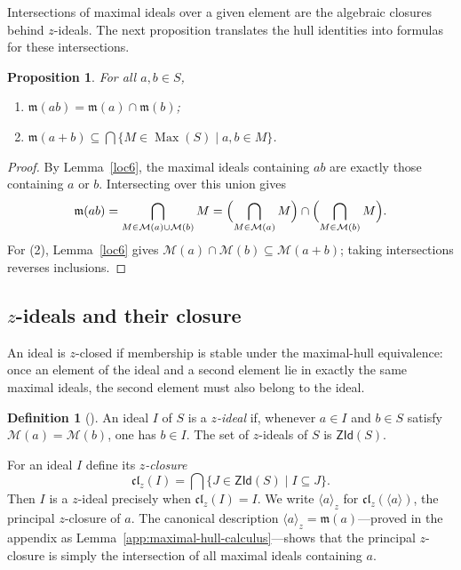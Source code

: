 \documentclass[11pt,leqno]{amsart}
\theoremstyle{plain}
\newtheorem{proposition}[theorem]{Proposition}
\theoremstyle{definition}
\newtheorem{definition}{Definition}[section]
\theoremstyle{remark}
\numberwithin{equation}{section}
\DeclareMathOperator{\Max}{Max}
\newcommand{\ZId}{\mathsf{ZId}}
\newcommand{\M}{\mathcal M}
\newcommand{\mfrak}{\mathfrak m}
\newcommand{\clz}{\mathfrak{cl}_{z}}
\newcommand{\ideal}[1]{\langle #1\rangle}
\begin{document}
Intersections of maximal ideals over a given element are the
algebraic closures behind $z$-ideals.
The next proposition translates the hull identities
into formulas for these intersections.

\begin{proposition}\label{prop:mfrak-basic}
For all $a,b\in S$,
\begin{enumerate}
\item $\mfrak(ab)=\mfrak(a)\cap\mfrak(b)$;
\item $\mfrak(a+b)\subseteq\displaystyle
  \bigcap\{M\in\Max(S)\mid a,b\in M\}$.
\end{enumerate}
\end{proposition}
\begin{proof}
By Lemma~\ref{loc6}, the maximal ideals containing $ab$ are exactly
those containing $a$ or $b$.  Intersecting over this union gives
\[
\mfrak(ab)=\bigcap_{M\in\M(a)\cup\M(b)}M
=\Bigl(\bigcap_{M\in\M(a)}M\Bigr)\cap\Bigl(\bigcap_{M\in\M(b)}M\Bigr).
\]
For (2), Lemma~\ref{loc6} gives $\M(a)\cap\M(b)\subseteq\M(a+b)$;
taking intersections reverses inclusions.
\end{proof}

\subsection{\texorpdfstring{$z$}{z}-ideals and their closure}

An ideal is $z$-closed if membership is stable under the
maximal-hull equivalence: once an element of the ideal and a second
element lie in exactly the same maximal ideals, the second element
must also belong to the ideal.

\begin{definition}[\cite{BiswasFilomat,AG23}]\label{def:zideal}
An ideal $I$ of $S$ is a \emph{$z$-ideal} if,
whenever $a\in I$ and $b\in S$ satisfy $\M(a)=\M(b)$, one has
$b\in I$.  The set of $z$-ideals of $S$ is $\ZId(S)$.
\end{definition}

For an ideal $I$ define its \emph{$z$-closure}
\[
\clz(I)=\bigcap\{J\in\ZId(S)\mid I\subseteq J\}.
\]
Then $I$ is a $z$-ideal precisely when $\clz(I)=I$.
We write $\ideal{a}_z$ for $\clz(\ideal{a})$,
the principal $z$-closure of $a$.
The canonical description $\ideal{a}_z=\mfrak(a)$---proved in
the appendix as Lemma~\ref{app:maximal-hull-calculus}---shows
that the principal $z$-closure is simply the intersection of
all maximal ideals containing $a$.
\end{document}
